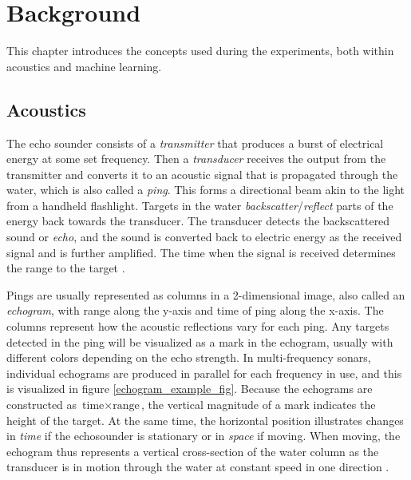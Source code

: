 \chapter{Background}
    This chapter introduces the concepts used during the experiments, both within acoustics and machine learning.
    
    
\section{Acoustics}\label{acoustics}
    
    The echo sounder consists of a \textit{transmitter} that produces a burst of electrical energy at some set frequency. Then a \textit{transducer} receives the output from the transmitter and converts it to an acoustic signal that is propagated through the water, which is also called a \textit{ping}. This forms a directional beam akin to the light from a handheld flashlight. Targets in the water \textit{backscatter}/\textit{reflect} parts of the energy back towards the transducer. The transducer detects the backscattered sound or \textit{echo}, and the sound is converted back to electric energy as the received signal and is further amplified. The time when the signal is received determines the range to the target \cite{simmonds2008fisheries}.
    
    Pings are usually represented as columns in a 2-dimensional image, also called an \textit{echogram}, with range along the y-axis and time of ping along the x-axis. The columns represent how the acoustic reflections vary for each ping. Any targets detected in the ping will be visualized as a mark in the echogram, usually with different colors depending on the echo strength. In multi-frequency sonars, individual echograms are produced in parallel for each frequency in use, and this is visualized in figure \ref{echogram_example_fig}. Because the echograms are constructed as $\text{time} \times \text{range}$, the vertical magnitude of a mark indicates the height of the target. At the same time,  the horizontal position illustrates changes in \textit{time} if the echosounder is stationary or in \textit{space} if moving. When moving, the echogram thus represents a vertical cross-section of the water column as the transducer is in motion through the water at constant speed in one direction \cite{simmonds2008fisheries}.
    

